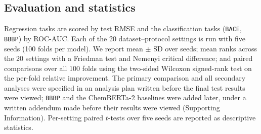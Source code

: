 \subsection{Evaluation and statistics}
Regression tasks are scored by test RMSE and the classification tasks (\texttt{BACE}, \texttt{BBBP}) by ROC-AUC. Each of the 20 dataset--protocol settings is run with five seeds (100 folds per model). We report mean $\pm$ SD over seeds; mean ranks across the 20 settings with a Friedman test and Nemenyi critical difference\cite{demsar2006statistical}; and paired comparisons over all 100 folds using the two-sided Wilcoxon signed-rank test on the per-fold relative improvement. The primary comparison and all secondary analyses were specified in an analysis plan written before the final test results were viewed; \texttt{BBBP} and the ChemBERTa-2 baselines were added later, under a written addendum made before their results were viewed (Supporting Information). Per-setting paired $t$-tests over five seeds are reported as descriptive statistics.
